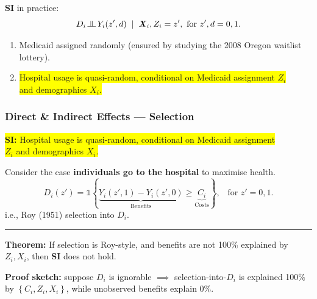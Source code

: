 \documentclass[dvipsnames]{beamer} %
\renewcommand{\vec}[1]{\boldsymbol{\mathit{#1}}}                           %
\newcommand{\indicator}[1]{\mathds{1}\left\{ #1 \right\}}                  %
\newcommand{\indep}{\, \raisebox{0.05em}{\rotatebox[origin=c]{90}{$\models$}} \,}%
\begin{document}
\begin{frame}[noframenumbering]
    \textbf{SI} in practice:
    \[ D_i \indep Y_i(z', d) \;\; | \;\; \vec X_i, Z_i = z',
    \text{ for } z', d = 0, 1. \]
    \begin{enumerate}
        \item Medicaid assigned randomly (ensured by studying the 2008 Oregon waitlist lottery).
        \item \colorbox{yellow}{Hospital usage is quasi-random, conditional on Medicaid assignment $Z_i$} \\
        \colorbox{yellow}{and demographics $\vec X_i$.}
    \end{enumerate}
\end{frame}
\begin{frame}[noframenumbering]
    \frametitle{Direct \& Indirect Effects --- Selection} 
    \colorbox{yellow}{\textbf{SI:}
        Hospital usage is quasi-random, conditional on Medicaid assignment} \\
    \colorbox{yellow}{$Z_i$ and demographics $\vec X_i$.}

    \vskip0.25cm
    Consider the case \textbf{individuals go to the hospital} to maximise health.
    \[ D_i \left( z' \right) = \indicator{
        \underbrace{Y_i\left( z', 1 \right) - Y_i\left( z', 0 \right)}_{\text{Benefits}}
        \geq \underbrace{C_i}_{\text{Costs}}}, \;\;\; \text{for } z'=0,1.
    \]
    i.e., Roy (1951) selection into $D_i$.
    \par\noindent\rule{\textwidth}{0.4pt}
    \pause
    \vfill
    \textbf{Theorem:}
    If selection is Roy-style, and benefits are not 100\% explained by $Z_i, \vec X_i$, then \textbf{SI} does not hold.

    \vskip0.125cm
    \textbf{Proof sketch:} suppose $D_i$ is ignorable $\implies$ selection-into-$D_i$ is explained 100\% by $\left\{ C_i, Z_i, \vec X_i \right\}$, while unobserved benefits explain 0\%.
\end{frame}
\end{document}
